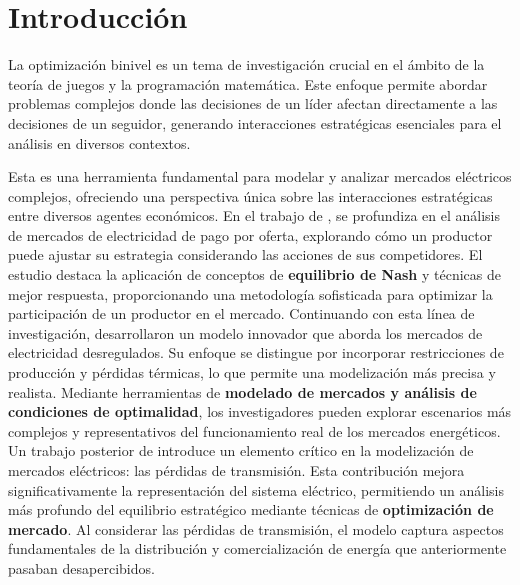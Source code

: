 \chapter{Introducción}
La optimización binivel es un tema de investigación crucial en el ámbito de la teoría de juegos y la programación matemática. Este enfoque permite abordar problemas complejos donde las decisiones de un líder afectan directamente a las decisiones de un seguidor, generando interacciones estratégicas esenciales para el análisis en diversos contextos.

Esta es una herramienta fundamental para modelar y analizar mercados eléctricos complejos, ofreciendo una perspectiva única sobre las interacciones estratégicas entre diversos agentes económicos.
En el trabajo de \cite{Aussel2017NashEI}, se profundiza en el análisis de mercados de electricidad de pago por oferta, explorando cómo un productor puede ajustar su estrategia considerando las acciones de sus competidores. El estudio destaca la aplicación de conceptos de \textbf{equilibrio de Nash} y técnicas de mejor respuesta, proporcionando una metodología sofisticada para optimizar la participación de un productor en el mercado.
Continuando con esta línea de investigación, \cite{Aussel2016DeregulatedEM} desarrollaron un modelo innovador que aborda los mercados de electricidad desregulados. Su enfoque se distingue por incorporar restricciones de producción y pérdidas térmicas, lo que permite una modelización más precisa y realista. Mediante herramientas de \textbf{modelado de mercados y análisis de condiciones de optimalidad}, los investigadores pueden explorar escenarios más complejos y representativos del funcionamiento real de los mercados energéticos.
Un trabajo posterior de \cite{Aussel2013ElectricitySM} introduce un elemento crítico en la modelización de mercados eléctricos: las pérdidas de transmisión. Esta contribución mejora significativamente la representación del sistema eléctrico, permitiendo un análisis más profundo del equilibrio estratégico mediante técnicas de \textbf{optimización de mercado}. Al considerar las pérdidas de transmisión, el modelo captura aspectos fundamentales de la distribución y comercialización de energía que anteriormente pasaban desapercibidos.

